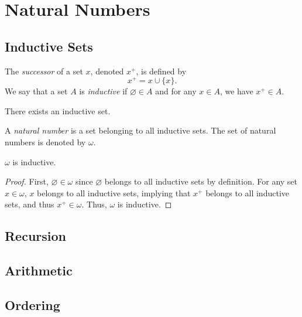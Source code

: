 \chapter{Natural Numbers}
\section{Inductive Sets}
\begin{definition}
  The \emph{successor} of a set $x$, denoted $x^+$, is defined by
  \begin{equation*}
    x^+ = x \cup \{x\}.
  \end{equation*}
  We say that a set $A$ is \emph{inductive} if $\varnothing \in A$ and for any
  $x \in A$, we have $x^+ \in A$.
\end{definition}

\begin{axiom}[Infinity]
  There exists an inductive set.
\end{axiom}

\begin{definition}
  A \emph{natural number} is a set belonging to all inductive sets.
  The set of natural numbers is denoted by $\omega$.
\end{definition}

\begin{theorem}
  $\omega$ is inductive.
\end{theorem}
\begin{proof}
  First, $\varnothing \in \omega$ since $\varnothing$ belongs to all inductive
  sets by definition.
  For any set $x \in \omega$, $x$ belongs to all inductive sets, implying that
  $x^+$ belongs to all inductive sets, and thus $x^+ \in \omega$.
  Thus, $\omega$ is inductive.
\end{proof}

\section{Recursion}

\section{Arithmetic}

\section{Ordering}